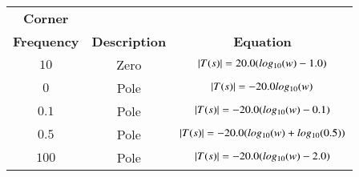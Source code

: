 \begin{tabular}{|c|c|c|}
\hline
     \textbf{Corner}&&\\ \textbf{Frequency} & \textbf{Description} & \textbf{Equation} \\
     \hline
     $10$ &  Zero & $\left\vert T(s)\right\vert = 20.0 (log_{10}(w) - 1.0)$\\
     \hline
     $0$ & Pole & $\left\vert T(s)\right\vert = -20.0 log_{10}(w)$\\
     \hline
     $0.1$ & Pole & $\left\vert T(s)\right\vert = -20.0 (log_{10}(w) - 0.1)$\\
     \hline
     $0.5$ & Pole & $\left\vert T(s)\right\vert = -20.0 (log_{10}(w) + log_{10}(0.5))$\\
     \hline
     $100$ & Pole & $\left\vert T(s)\right\vert = -20.0 (log_{10}(w) - 2.0)$\\
     \hline
\end{tabular}
